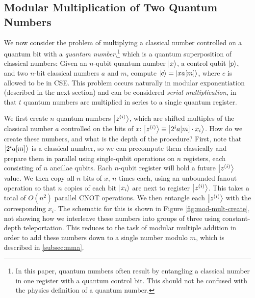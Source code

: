 \documentclass[twoside]{article}
\begin{document}
\subsection{Modular Multiplication of Two Quantum Numbers}
\label{subsec:csa-mod-mult-qq}

We now consider the problem of multiplying a classical number controlled
on a quantum bit with a
\emph{quantum number},\footnote{In this paper, quantum
numbers often result by entangling a classical number in one register with a
quantum control bit. This should not be confused with the physics definition
of a quantum number.} which is a
quantum superposition of classical numbers:
Given an $n$-qubit quantum number $\left\vert{x}\right\rangle$, a control qubit $\left\vert{p}\right\rangle$,
and two $n$-bit classical numbers $a$
and $m$,
compute $\left\vert{c}\right\rangle = \left\vert{xa[m]}\right\rangle$, where $c$ is allowed to be in CSE.
This problem occurs naturally in modular exponentiation (described in
the next section) and can be considered \emph{serial multiplication},
in that $t$ quantum numbers are multiplied in series to a single
quantum register.

We first create $n$ quantum numbers $\left\vert{z^{(i)}}\right\rangle$,
which are shifted multiples of the classical number $a$ controlled on the bits
of $x$:
$\left\vert{z^{(i)}}\right\rangle \equiv \left\vert{2^i a[m] \cdot x_i }\right\rangle$.
How do we create these numbers, and what is the depth of the procedure?
First, note that $\left\vert{2^i a[m]}\right\rangle$ is a classical number, so we can
precompute them classically and prepare them in parallel using single-qubit
operations
on $n$ registers, each consisting of $n$ ancillae qubits. Each $n$-qubit
register will hold a future $\left\vert{z^{(i)}}\right\rangle$ value.
We then copy all
$n$ bits of $x$, $n$ times each, using an unbounded fanout operation so that
$n$ copies of each bit $\left\vert{x_i}\right\rangle$ are next to register $\left\vert{z^{(i)}}\right\rangle$.
This takes a total of $O(n^2)$ parallel CNOT operations.
We then entangle each $\left\vert{z^{(i)}}\right\rangle$ with the corresponding $x_i$.
The schematic for this is shown in Figure \ref{fig:mod-mult-create}, not
showing how we interleave these numbers into groups of three using
constant-depth teleportation. This reduces to the task of modular
multiple addition in order to add these numbers down to a single
number modulo $m$, which is described in \ref{subsec:mma}.
\end{document}
